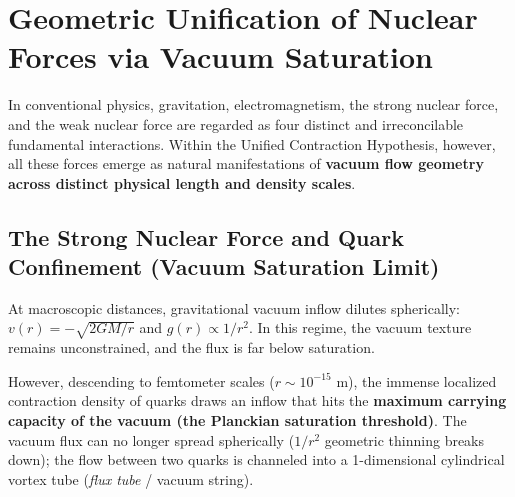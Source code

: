 \section{Geometric Unification of Nuclear Forces via Vacuum Saturation}
\label{sec:nukleer_kuvvetler}

In conventional physics, gravitation, electromagnetism, the strong nuclear force, and the weak nuclear force are regarded as four distinct and irreconcilable fundamental interactions. Within the Unified Contraction Hypothesis, however, all these forces emerge as natural manifestations of \textbf{vacuum flow geometry across distinct physical length and density scales}.

\subsection{The Strong Nuclear Force and Quark Confinement (Vacuum Saturation Limit)}
At macroscopic distances, gravitational vacuum inflow dilutes spherically: $v(r) = -\sqrt{2GM/r}$ and $g(r) \propto 1/r^2$. In this regime, the vacuum texture remains unconstrained, and the flux is far below saturation.

However, descending to femtometer scales ($r \sim 10^{-15}\text{ m}$), the immense localized contraction density of quarks draws an inflow that hits the \textbf{maximum carrying capacity of the vacuum (the Planckian saturation threshold)}. The vacuum flux can no longer spread spherically ($1/r^2$ geometric thinning breaks down); the flow between two quarks is channeled into a 1-dimensional cylindrical vortex tube (\textit{flux tube} / vacuum string).

